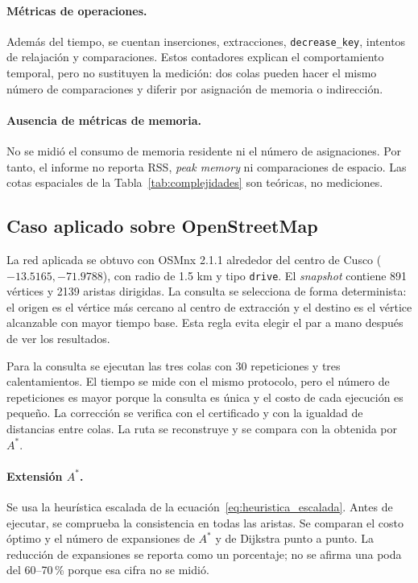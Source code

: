 \paragraph{Métricas de operaciones.} Además del tiempo, se cuentan inserciones, extracciones, \texttt{decrease\_key}, intentos de relajación y comparaciones. Estos contadores explican el comportamiento temporal, pero no sustituyen la medición: dos colas pueden hacer el mismo número de comparaciones y diferir por asignación de memoria o indirección.

\paragraph{Ausencia de métricas de memoria.} No se midió el consumo de memoria residente ni el número de asignaciones. Por tanto, el informe no reporta RSS, \textit{peak memory} ni comparaciones de espacio. Las cotas espaciales de la Tabla~\ref{tab:complejidades} son teóricas, no mediciones.

\subsection{Caso aplicado sobre OpenStreetMap}
La red aplicada se obtuvo con OSMnx 2.1.1 alrededor del centro de Cusco ($-13.5165,-71.9788$), con radio de 1.5 km y tipo \texttt{drive}. El \textit{snapshot} contiene 891 vértices y 2139 aristas dirigidas. La consulta se selecciona de forma determinista: el origen es el vértice más cercano al centro de extracción y el destino es el vértice alcanzable con mayor tiempo base. Esta regla evita elegir el par a mano después de ver los resultados.

Para la consulta se ejecutan las tres colas con 30 repeticiones y tres calentamientos. El tiempo se mide con el mismo protocolo, pero el número de repeticiones es mayor porque la consulta es única y el costo de cada ejecución es pequeño. La corrección se verifica con el certificado y con la igualdad de distancias entre colas. La ruta se reconstruye y se compara con la obtenida por $A^*$.

\paragraph{Extensión $A^*$.} Se usa la heurística escalada de la ecuación~\eqref{eq:heuristica_escalada}. Antes de ejecutar, se comprueba la consistencia en todas las aristas. Se comparan el costo óptimo y el número de expansiones de $A^*$ y de Dijkstra punto a punto. La reducción de expansiones se reporta como un porcentaje; no se afirma una poda del 60--70\,\% porque esa cifra no se midió.

